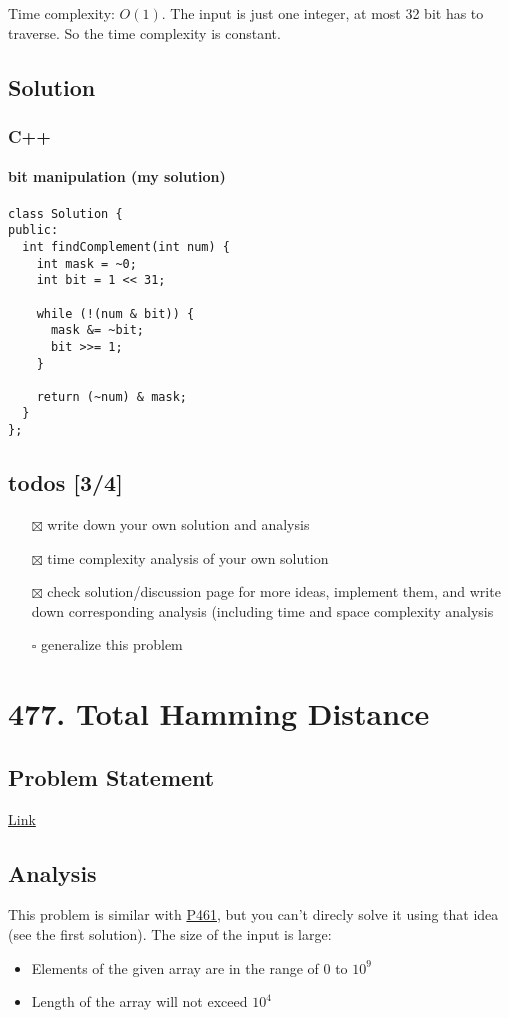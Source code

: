 \documentclass[12pt]{article}
\begin{document}
Time complexity: \(O(1)\). The input is just one integer, at most 32 bit has to traverse. So the time complexity is constant.
\subsection{Solution}
\label{sec:orgccebd88}
\subsubsection{C++}
\label{sec:org90e6514}
\paragraph{bit manipulation (my solution)}
\label{sec:org469ac41}
\begin{verbatim}
class Solution {
public:
  int findComplement(int num) {
    int mask = ~0;
    int bit = 1 << 31;

    while (!(num & bit)) {
      mask &= ~bit;
      bit >>= 1;
    }

    return (~num) & mask;
  }
};
\end{verbatim}
\subsection{todos [3/4]}
\label{sec:orgc30b5ba}
\begin{itemize}
\item[{$\boxtimes$}] write down your own solution and analysis
\item[{$\boxtimes$}] time complexity analysis of your own solution
\item[{$\boxtimes$}] check solution/discussion page for more ideas, implement them, and write down corresponding analysis (including time and space complexity analysis
\item[{$\square$}] generalize this problem
\end{itemize}
\section{477. Total Hamming Distance}
\label{sec:org6296bb8}
\subsection{Problem Statement}
\label{sec:org3456869}
\href{https://leetcode.com/problems/total-hamming-distance/}{Link}
\subsection{Analysis}
\label{sec:orge5719dd}
This problem is similar with \hyperref[orgbdf1f35]{P461}, but you can't direcly solve it using that idea (see the first solution). The size of the input is large:
\begin{itemize}
\item Elements of the given array are in the range of \(0\) to \(10^9\)
\item Length of the array will not exceed \(10^4\)
\end{itemize}
\end{document}
